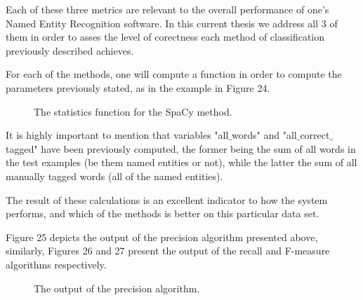\documentclass[12pt,a4paper]{article}
\begin{document}
\qquad Each of these three metrics are relevant to the overall performance of one's Named Entity Recognition software. In this current thesis we address all 3 of them in order to asses the level of corectness each method of classification previously described achieves.

\qquad For each of the methods, one will compute a function in order to compute the parameters previously stated, as in the example in Figure 24.

\begin{figure}[h!]
\begin{center}
\end{center}
\caption{The statistics function for the SpaCy method.}
\end{figure}

\qquad It is highly important to mention that variables "all$\_$words" and "all$\_$correct$\_$tagged" have been previously computed, the former being the sum of all words in the test examples (be them named entities or not), while the latter the sum of all manually tagged words (all of the named entities).

\qquad The result of these calculations is an excellent indicator to how the system performs, and which of the methods is better on this particular data set.

\qquad Figure 25 depicts the output of the precision algorithm presented above, similarly, Figures 26 and 27 present the output of the recall and F-measure algorithms respectively.

\begin{figure}[h!]
\begin{center}
\end{center}
\caption{The output of the precision algorithm.}
\end{figure}
\end{document}
